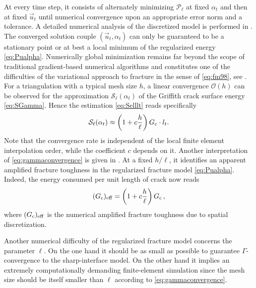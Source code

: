 At every time step, it consists of alternately minimizing $\mathcal{P}_\ell$ at fixed $\alpha_t$ and then at fixed $\vec{u}_t$ until numerical convergence upon an appropriate error norm and a tolerance. A detailed numerical analysis of the discretized model is performed in \cite{BourdinFrancfortMarigo:2008}. The converged solution couple $(\vec{u}_t,\alpha_t)$ can only be guaranteed to be a stationary point or at best a local minimum of the regularized energy \eqref{eq:Pualpha}. Numerically global minimization remains far beyond the scope of traditional gradient-based numerical algorithms and constitutes one of the difficulties of the variational approach to fracture in the sense of \eqref{eq:fm98}, see \cite{BourdinFrancfortMarigo:2008}. For a triangulation with a typical mesh size $h$, a linear convergence $\mathcal{O}(h)$ can be observed for the approximation $\mathcal{S}_\ell(\alpha_t)$ of the Griffith crack surface energy \eqref{eq:SGamma}. Hence the estimation \eqref{eq:Selllt} reads specifically
\begin{equation} \label{eq:gammaconvergence}
\mathcal{S}_\ell(\alpha_t)\approx\left(1+c\frac{h}{\ell}\right)G_\mathrm{c}\cdot l_t.
\end{equation}
Note that the convergence rate is independent of the local finite element interpolation order, while the coefficient $c$ depends on it. Another interpretation of \eqref{eq:gammaconvergence} is given in \cite{BourdinFrancfortMarigo:2008}. At a fixed $h/\ell$, it identifies an apparent amplified fracture toughness in the regularized fracture model \eqref{eq:Pualpha}. Indeed, the energy consumed per unit length of crack now reads
\begin{equation} \label{eq:gceff}
(G_\mathrm{c})_\mathrm{eff}=\left(1+c\frac{h}{\ell}\right)G_\mathrm{c}\,,
\end{equation}
where $(G_\mathrm{c})_\mathrm{eff}$ is the numerical amplified fracture toughness due to spatial discretization.

Another numerical difficulty of the regularized fracture model concerns the parameter $\ell$. On the one hand it should be as small as possible to guarantee $\Gamma$-convergence to the sharp-interface model. On the other hand it implies an extremely computationally demanding finite-element simulation since the mesh size should be itself smaller than $\ell$ according to \eqref{eq:gammaconvergence}.

